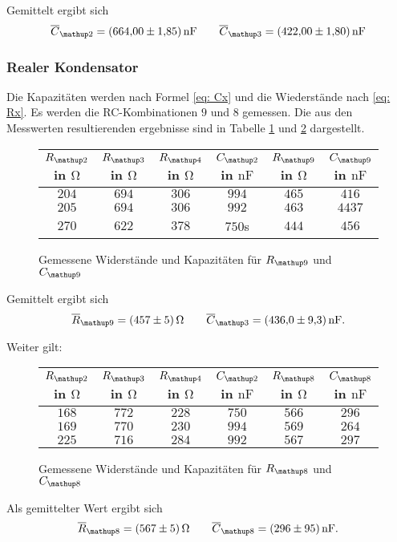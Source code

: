 Gemittelt ergibt sich
\begin{equation}
\label{eq:wert_c12_c_13}
\overline{C}_{\map{2}}=\SI{664\pm1.85}{\nano\farad} \qquad \overline{C}_{\map{3}}=\SI{422\pm1.80}{\nano\farad}
\end{equation}

\subsubsection{Realer Kondensator}

Die Kapazitäten werden nach Formel \eqref{eq: Cx} und die 
Wiederstände nach \eqref{eq: Rx}.
Es werden die RC-Kombinationen $9$ und $8$ gemessen.
Die aus den Messwerten resultierenden ergebnisse sind in Tabelle 
\ref{tab:rc_r9} und \ref{tab:rc_r8} dargestellt.

\begin{figure}
\centering
\caption{Gemessene Widerstände und Kapazitäten für $R\ua{9}$ und $C\ua{9}$}
  \label{tab:rc_r9}
\begin{tabular}{S S S S S S }
    \toprule
    {$R\ua{2}$ in $\si{\ohm}$} &  {$R\ua{3}$ in $\si{\ohm}$} & {$R\ua{4}$ in $\si{\ohm}$} & {$C\ua{2}$ in $\si{\nano\farad}$}& {$R\ua{9}$ in $\si{\ohm}$} &  {$C\ua{9}$ in $\si{\nano\farad}$} \\
    \midrule
     {$\num{204}$} & {$\num{694}$} &  {$\num{306}$}& {$\num{994}$}  &  {$\num{465}$} & {$\num{416}$}\\
     {$\num{205}$} & {$\num{694}$}  & {$\num{306}$} & {$\num{992}$} & {$\num{463}$} & {$\num{4437}$}\\
     {$\num{270}$} & {$\num{622}$}  & {$\num{378}$} & {$\num{750}$s} &{$\num{444}$} & {$\num{456}$}  \\
 
     \bottomrule
  \end{tabular}
 \end{figure}
Gemittelt ergibt sich
\begin{equation}
\label{eq:wert_r9_c_9}
\overline{R}_{\map{9}}=\SI{457\pm5}{\ohm} \qquad \overline{C}_{\map{3}}=\SI{436\pm9.3}{\nano\farad}.
\end{equation}

Weiter gilt:

\begin{figure}
\centering
\caption{Gemessene Widerstände und Kapazitäten für $R\ua{8}$ und $C\ua{8}$}
  \label{tab:rc_r8}
  \begin{tabular}{S S S S S S}
  \toprule
    {$R\ua{2}$ in $\si{\ohm}$} &  {$R\ua{3}$ in $\si{\ohm}$} & {$R\ua{4}$ in $\si{\ohm}$} & {$C\ua{2}$ in $\si{\nano\farad}$}& {$R\ua{8}$ in $\si{\ohm}$} &  {$C\ua{8}$ in $\si{\nano\farad}$} \\
    \midrule
    {$\num{168}$} & {$\num{772}$} &  {$\num{228}$}& {$\num{750}$}  &  {$\num{566}$} & {$\num{296}$}\\
     {$\num{169}$} & {$\num{770}$}  & {$\num{230}$} & {$\num{994}$} & {$\num{569}$} & {$\num{264}$}\\
     {$\num{225}$} & {$\num{716}$}  & {$\num{284}$} & {$\num{992}$} &{$\num{567}$} & {$\num{297}$}  \\
     \bottomrule
    \end{tabular}
\end{figure}

Als gemittelter Wert ergibt sich
\begin{equation}
\label{eq:wert_r8_c_8}
\overline{R}_{\map{8}}=\SI{567\pm5}{\ohm} \qquad \overline{C}_{\map{8}}=\SI{296\pm95}{\nano\farad}.
\end{equation}

